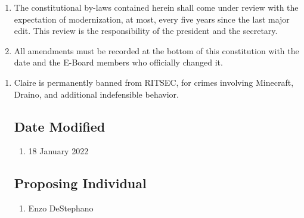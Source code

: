 


\begin{enumerate}
  \item The constitutional by-laws contained herein shall come under review
    with the expectation of modernization, at most, every five years since the
    last major edit. This review is the responsibility of the president and the
    secretary.
  \item All amendments must be recorded at the bottom of this constitution with
    the date and the E-Board members who officially changed it.
\end{enumerate}


  \begin{enumerate}
    \item Claire is permanently banned from RITSEC, for crimes involving Minecraft, Draino, and additional indefensible behavior.


      \subsection{Date Modified}
      \begin{enumerate}
        \item 18 January 2022
      \end{enumerate}

      \subsection{Proposing Individual}
      \begin{enumerate}
        \item Enzo DeStephano
      \end{enumerate}
    
    \end{enumerate}
    

